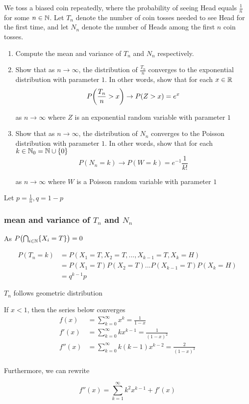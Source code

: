 \documentclass{article}
\begin{document}
We toss a biased coin repeatedly, where the probability of seeing Head equals $\frac{1}{n}$ for some $n \in \mathbb{N}$. Let $T_n$ denote the number of coin tosses needed to see Head for the first time, and let $N_n$ denote the number of Heads among the first $n$ coin tosses.
\begin{enumerate}
    \item Compute the mean and variance of $T_n$ and $N_n$ respectively.
    
    \item Show that as $n \to \infty$, the distribution of $\frac{T_n}{n}$ converges to the exponential distribution with parameter $1$. In other words, show that for each $x \in \mathbb{R}$
    $$
        P\tuple*{\frac{T_n}{n} > x} \to P(Z > x) = e^x
    $$

    as $n \to \infty$ where $Z$ is an exponential random variable with parameter $1$

    \item Show that as $n \to \infty$, the distribution of $N_n$ converges to the Poisson distribution with parameter $1$. In other words, show that for each $k \in \mathbb{N}_0 = \mathbb{N} \cup \{0\}$
    $$
        P(N_n = k) \to P(W = k) = e^{-1} \frac{1}{k!}
    $$

    as $n \to \infty$ where $W$ is a Poisson random variable with parameter $1$
\end{enumerate}

Let $p = \frac{1}{n}, q = 1 - p$

\subsubsection{mean and variance of $T_n$ and $N_n$}

As $P\tuple*{\bigcap_{i \in \N} \set{X_i = T}} = 0$

\begin{align*}
    P(T_n = k)
    &= P(X_1=T, X_2=T, ..., X_{k-1}=T, X_k = H) \\
    &= P(X_1=T)P(X_2=T) ... P(X_{k-1}=T) P(X_k = H) \\
    &= q^{k-1} p
\end{align*}

$T_n$ follows geometric distribution

\begin{lemma}
    If $x < 1$, then the series below converges
    \begin{align*}
        f(x)    &= \sum_{k=0}^\infty x^k = \frac{1}{1-x} \\
        f'(x)   &= \sum_{k=0}^\infty k x^{k-1} = \frac{1}{(1-x)^2} \\
        f''(x)  &= \sum_{k=0}^\infty k(k-1) x^{k-2} = \frac{2}{(1-x)^3} \\
    \end{align*}

    Furthermore, we can rewrite

    $$
        f''(x) = \sum_{k=1}^\infty k^2 x^{k-1} + f'(x)
    $$
    
\end{lemma}
\end{document}
